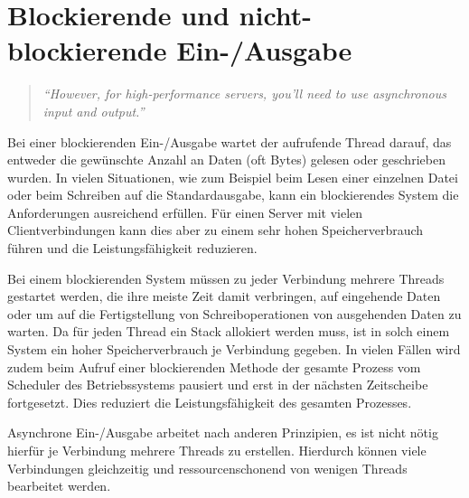 	
	
	


\section{Blockierende und nicht-blockierende Ein-/Ausgabe}

\begin{quotation}
	\textit{\enquote{However, for high-performance servers, you'll need to use asynchronous input and output.}}
	\cite[454]{rust:orly_programming}
\end{quotation}


Bei einer blockierenden Ein-/Ausgabe wartet der aufrufende Thread darauf, das entweder die gewünschte Anzahl an Daten (oft Bytes) gelesen oder geschrieben wurden.
In vielen Situationen, wie zum Beispiel beim Lesen einer einzelnen Datei oder beim Schreiben auf die Standardausgabe, kann ein blockierendes System die Anforderungen ausreichend erfüllen.
Für einen Server mit vielen Clientverbindungen kann dies aber zu einem sehr hohen Speicherverbrauch führen und die Leistungsfähigkeit reduzieren.

Bei einem blockierenden System müssen zu jeder Verbindung mehrere Threads gestartet werden, die ihre meiste Zeit damit verbringen, auf eingehende Daten oder um auf die Fertigstellung  von Schreiboperationen von ausgehenden Daten zu warten.
Da für jeden Thread ein Stack allokiert werden muss, ist in solch einem System ein hoher Speicherverbrauch je Verbindung gegeben.
In vielen Fällen wird zudem beim Aufruf einer blockierenden Methode der gesamte Prozess vom Scheduler des Betriebssystems pausiert und erst in der nächsten Zeitscheibe fortgesetzt.
Dies reduziert die Leistungsfähigkeit des gesamten Prozesses.

Asynchrone Ein-/Ausgabe arbeitet nach anderen Prinzipien, es ist nicht nötig hierfür je Verbindung mehrere Threads zu erstellen.
Hierdurch können viele Verbindungen gleichzeitig und ressourcenschonend von wenigen Threads bearbeitet werden.

